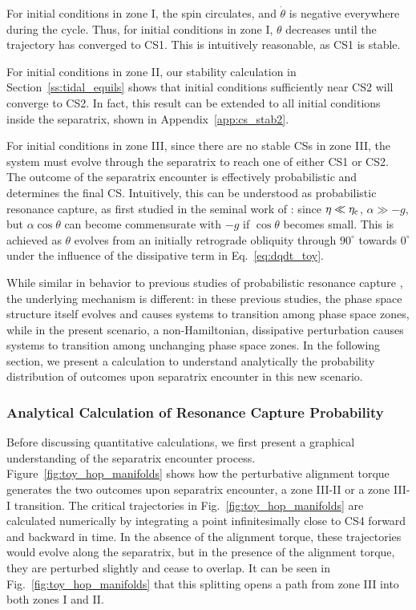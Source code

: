 \documentclass[
        fleqn,
        usenatbib,
        referee,
    ]{mnras}
\begin{document}
For initial conditions in zone I, the spin circulates, and $\dot{\theta}$ is
negative everywhere during the cycle. Thus, for initial conditions in zone I,
$\theta$ decreases until the trajectory has converged to CS1. This is
intuitively reasonable, as CS1 is stable.

For initial conditions in zone II, our stability calculation in
Section~\ref{ss:tidal_equils} shows that initial conditions sufficiently near CS2
will converge to CS2. In fact, this result can be extended to all initial
conditions inside the separatrix, shown in Appendix~\ref{app:cs_stab2}.

For initial conditions in zone III, since there are no stable CSs in zone III,
the system must evolve through the separatrix to reach one of either CS1 or CS2.
The outcome of the separatrix encounter is effectively probabilistic and
determines the final CS\@. Intuitively, this can be understood as probabilistic
resonance capture, as first studied in the seminal work of \citet{henrard1982}:
since $\eta \ll \eta_{\rm c}$, $\alpha \gg -g$, but $\alpha \cos \theta$ can
become commensurate with $-g$ if $\cos \theta$ becomes small. This is achieved
as $\theta$ evolves from an initially retrograde obliquity through $90^\circ$
towards $0^\circ$ under the influence of the dissipative term in
Eq.~\eqref{eq:dqdt_toy}.

While similar in behavior to previous studies of probabilistic resonance capture
\citep{henrard1982, su2020}, the underlying mechanism is different: in these
previous studies, the phase space structure itself evolves and causes systems to
transition among phase space zones, while in the present scenario, a
non-Hamiltonian, dissipative perturbation causes systems to transition among
unchanging phase space zones. In the following section, we present a calculation
to understand analytically the probability distribution of outcomes upon
separatrix encounter in this new scenario.

\subsubsection{Analytical Calculation of Resonance Capture Probability}

Before discussing quantitative calculations, we first present a graphical
understanding of the separatrix encounter process.
Figure~\ref{fig:toy_hop_manifolds} shows how the perturbative alignment torque
generates the two outcomes upon separatrix encounter, a zone III-II or a zone
III-I transition. The critical trajectories in Fig.~\ref{fig:toy_hop_manifolds}
are calculated numerically by integrating a point infinitesimally close to CS4
forward and backward in time. In the absence of the alignment torque, these
trajectories would evolve along the separatrix, but in the presence of the
alignment torque, they are perturbed slightly and cease to overlap. It can be
seen in Fig.~\ref{fig:toy_hop_manifolds} that this splitting opens a path from
zone III into both zones I and II\@.
\end{document}
